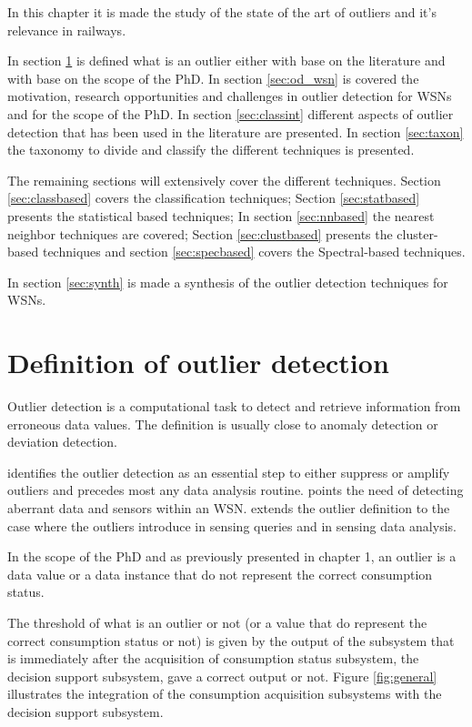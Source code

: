 In this chapter it is  made the study of the state of the art of outliers and it's relevance in railways.

In section \ref{sec:def} is defined what is an outlier either with base on the literature and with base on the scope of the PhD. 
In section \ref{sec:od_wsn} is covered the motivation, research opportunities and challenges in outlier detection for WSNs and for the scope of the PhD. 
In section \ref{sec:classint} different aspects of outlier detection that has been used in the literature are presented. 
In section \ref{sec:taxon} the taxonomy to divide and classify the different techniques is presented.

The remaining sections will extensively cover the different techniques. Section \ref{sec:classbased} covers the classification techniques; Section \ref{sec:statbased} presents the statistical based techniques; In section \ref{sec:nnbased} the nearest neighbor techniques are covered; Section \ref{sec:clustbased} presents the cluster-based techniques and section \ref{sec:specbased} covers the Spectral-based techniques.

In section \ref{sec:synth} is made a synthesis of the outlier detection techniques for WSNs.


\section{Definition of outlier detection}
\label{sec:def}
Outlier detection is a computational task to detect and retrieve information from erroneous data values. The definition is usually close to anomaly detection or deviation detection. 

\cite{class:branch:2006} identifies the outlier detection as an essential step to either suppress or amplify outliers and precedes most any data analysis routine. \cite{nn:abid:2016} points the need of detecting aberrant data and sensors within an WSN. \cite{nn:zhuang:2006} extends the outlier definition to the case where the outliers introduce in sensing queries and in sensing data analysis.

\vspace{1em}

In the scope of the PhD and as previously presented in chapter 1, an outlier is a data value or a data instance that do not represent the correct consumption status.

The threshold of what is an outlier or not (or a value that do represent the correct consumption status or not) is given by the output of the subsystem that is immediately after the acquisition of consumption status subsystem, the decision support subsystem, gave a correct output or not. Figure \ref{fig:general} illustrates the integration of the consumption acquisition subsystems with the decision support subsystem.


